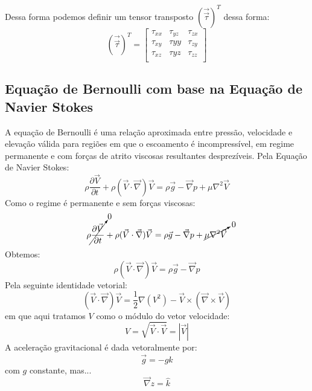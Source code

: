 \documentclass[12pt,a4paper]{article}
\begin{document}
Dessa forma podemos definir um tensor transposto $(\Vec{\Vec{\tau}})^{T}$ dessa forma:
\begin{equation}
    (\Vec{\Vec{\tau}})^{T} = \begin{bmatrix}
    \tau_{xx} & \tau_{yz} & \tau_{zx}\\
    \tau_{xy} & \tau{yy} & \tau_{zy}\\
    \tau_{xz} & \tau{yz} & \tau_{zz}\\
    \end{bmatrix}
\end{equation}
\subsection{Equação de Bernoulli com base na Equação de Navier Stokes}
A equação de Bernoulli é uma relação aproximada entre pressão, velocidade e elevação válida para regiões em que o escoamento é incompressível, em regime permanente e com forças de atrito viscosas resultantes desprezíveis. 
Pela Equação de Navier Stokes:
\begin{equation}
    \rho\frac{\partial\vec{V}}{\partial t} + \rho(\vec{V}\cdot\vec{\nabla})\vec{V} = \rho\vec{g} - \vec{\nabla}p + \mu\nabla^{2}\vec{V}
\end{equation}
Como o regime é permanente e sem forças viscosas:
\begin{equation}
    \rho\cancelto{0}{\frac{\partial\vec{V}}{\partial t}} + \rho(\vec{V}\cdot\vec{\nabla})\vec{V} = \rho\vec{g} - \vec{\nabla}p + \cancelto{0}{\mu\nabla^{2}\vec{V}}
\end{equation}
Obtemos:
\begin{equation}
    \rho(\vec{V}\cdot\vec{\nabla})\vec{V} = \rho\vec{g} - \vec{\nabla}p
    \label{equacaonavierstokesadaptada}
\end{equation}
Pela seguinte identidade vetorial:
\begin{equation}
    (\vec{V}\cdot\vec{\nabla})\vec{V} = \frac{1}{2}\nabla(V^{2}) - \vec{V}\times (\vec{\nabla} \times \vec{V})
    \label{identidadevetorial}
\end{equation}
em que aqui tratamos $V$ como o módulo do vetor velocidade:
\begin{equation}
    V = \sqrt{\vec{V}\cdot\vec{V}} = |\vec{V}|
\end{equation}
A aceleração gravitacional é dada vetoralmente por:
\begin{equation}
    \vec{g} = -g\hat{k}
\end{equation}
com $g$ constante, mas...
\begin{equation}
    \vec{\nabla}z = \hat{k}
\end{equation}
\end{document}
